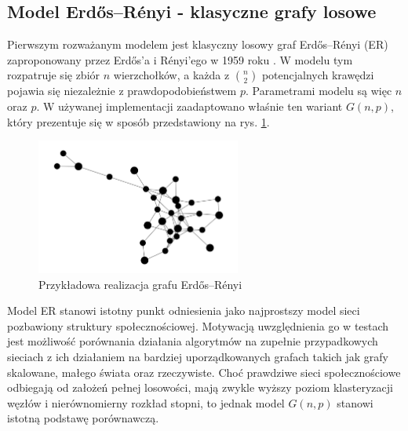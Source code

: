 \subsection{Model Erdős--Rényi - klasyczne grafy losowe}
Pierwszym rozważanym modelem jest klasyczny losowy graf Erdős--Rényi (ER) zaproponowany przez Erd\H{o}s'a i Rényi'ego w 1959 roku \cite{ErdosRenyi1960}. W modelu tym rozpatruje się zbiór $n$ wierzchołków, a każda z $\binom{n}{2}$ potencjalnych krawędzi pojawia się niezależnie z prawdopodobieństwem $p$. Parametrami modelu są więc $n$ oraz $p$. W używanej implementacji zaadaptowano właśnie ten wariant $G(n,p)$, który prezentuje się w sposób przedstawiony na rys. \ref{fig:ER}.

\begin{figure}[h]
    \centering
    \includegraphics[width=0.6\textwidth]{assets/test_data/random.png}
    \caption{Przykładowa realizacja grafu Erdős--Rényi}
    \label{fig:ER}
\end{figure}

Model ER stanowi istotny punkt odniesienia jako najprostszy model sieci pozbawiony struktury społecznościowej. Motywacją uwzględnienia go w testach jest możliwość porównania działania algorytmów na zupełnie przypadkowych sieciach z ich działaniem na bardziej uporządkowanych grafach takich jak grafy skalowane, małego świata oraz rzeczywiste. Choć prawdziwe sieci społecznościowe odbiegają od założeń pełnej losowości, mają zwykle wyższy poziom klasteryzacji węzłów i nierównomierny rozkład stopni, to jednak model $G(n, p)$ stanowi istotną podstawę porównawczą.

